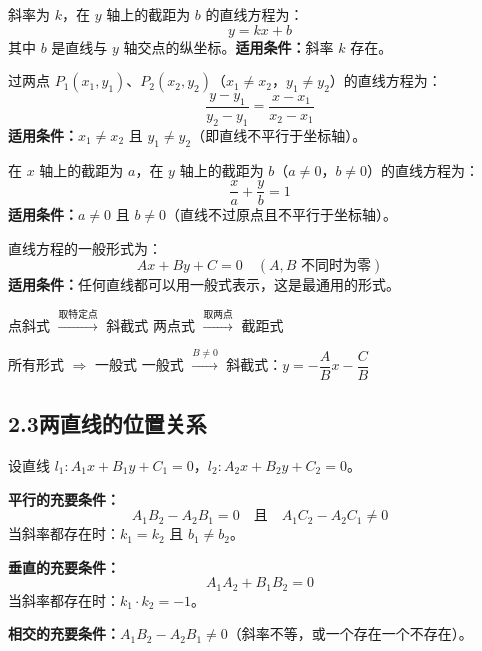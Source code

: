 \documentclass[12pt, a4paper]{ctexart}
\begin{document}
\begin{knowledgebox}[斜截式]
斜率为 $k$，在 $y$ 轴上的截距为 $b$ 的直线方程为：
\[
\boxed{y = kx + b}
\]
其中 $b$ 是直线与 $y$ 轴交点的纵坐标。\textbf{适用条件：}斜率 $k$ 存在。
\end{knowledgebox}

\begin{knowledgebox}[两点式]
过两点 $P_1(x_1, y_1)$、$P_2(x_2, y_2)$（$x_1 \neq x_2$，$y_1 \neq y_2$）的直线方程为：
\[
\boxed{\frac{y - y_1}{y_2 - y_1} = \frac{x - x_1}{x_2 - x_1}}
\]
\textbf{适用条件：}$x_1 \neq x_2$ 且 $y_1 \neq y_2$（即直线不平行于坐标轴）。
\end{knowledgebox}

\begin{knowledgebox}[截距式]
在 $x$ 轴上的截距为 $a$，在 $y$ 轴上的截距为 $b$（$a \neq 0$，$b \neq 0$）的直线方程为：
\[
\boxed{\frac{x}{a} + \frac{y}{b} = 1}
\]
\textbf{适用条件：}$a \neq 0$ 且 $b \neq 0$（直线不过原点且不平行于坐标轴）。
\end{knowledgebox}

\begin{knowledgebox}[一般式]
直线方程的一般形式为：
\[
\boxed{Ax + By + C = 0} \quad (A, B \text{ 不同时为零})
\]
\textbf{适用条件：}任何直线都可以用一般式表示，这是最通用的形式。
\end{knowledgebox}

\begin{tipbox}[五种形式的转化关系]
点斜式 $\xrightarrow{\text{取特定点}}$ 斜截式 \quad
两点式 $\xrightarrow{\text{取两点}}$ 截距式

所有形式 $\Longrightarrow$ 一般式 \quad
一般式 $\xrightarrow{B \neq 0}$ 斜截式：$y = -\dfrac{A}{B}x - \dfrac{C}{B}$
\end{tipbox}

\subsection*{2.3\quad 两直线的位置关系}

设直线 $l_1: A_1x + B_1y + C_1 = 0$，$l_2: A_2x + B_2y + C_2 = 0$。

\begin{knowledgebox}[两直线的平行与垂直]
\textbf{平行的充要条件：}
\[
\boxed{A_1B_2 - A_2B_1 = 0 \quad \text{且} \quad A_1C_2 - A_2C_1 \neq 0}
\]
当斜率都存在时：$k_1 = k_2$ 且 $b_1 \neq b_2$。

\textbf{垂直的充要条件：}
\[
\boxed{A_1A_2 + B_1B_2 = 0}
\]
当斜率都存在时：$k_1 \cdot k_2 = -1$。

\textbf{相交的充要条件：}$A_1B_2 - A_2B_1 \neq 0$（斜率不等，或一个存在一个不存在）。
\end{knowledgebox}
\end{document}
